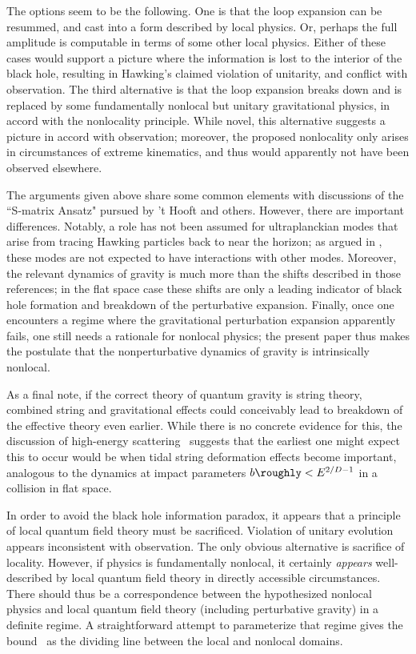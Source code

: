The options seem to be the following.  One is that the loop expansion can be resummed, and cast into a form described by local physics.  Or, perhaps the full amplitude is computable in terms of some other local physics.  Either of these cases would support a picture where the information is lost to the interior of the black hole, resulting in Hawking's claimed violation of unitarity, and conflict with observation.  The third alternative is that the loop expansion breaks down and is replaced by some fundamentally nonlocal but unitary gravitational physics, in accord with the nonlocality principle.  While novel, this alternative suggests a picture in accord with observation; moreover, the proposed nonlocality only arises in circumstances of extreme kinematics, and thus would apparently not have been observed elsewhere.  

The arguments given above share some common elements with discussions of the ``S-matrix Ansatz" pursued by 't Hooft and others.  However, there are important differences.  Notably, a role has not been assumed for ultraplanckian modes that arise from tracing Hawking particles back to near the horizon; as argued in \SGnonloc, these modes are not expected to have interactions with other modes.  Moreover, the relevant dynamics of gravity is much more than the shifts described in those references; in the flat space case these shifts are only a leading indicator of black hole formation and breakdown of the perturbative expansion.  Finally, once one encounters a regime where the gravitational perturbation expansion apparently fails, one still needs a rationale for nonlocal physics; the present paper thus makes the postulate that the nonperturbative dynamics of gravity is intrinsically nonlocal.


As a final note, if the correct theory of quantum gravity is string theory, combined string and gravitational effects could conceivably lead to breakdown of the effective theory even earlier.  While there is no concrete evidence for this, the discussion of high-energy scattering \LQGST\ suggests that the earliest one might expect this to occur would be when tidal string deformation effects become important, analogous to the dynamics at impact parameters $b\roughly< E^{2/D-1}$ in a collision in flat space.


In order to avoid the black hole information paradox, it appears that a principle of local quantum field theory must be sacrificed.  Violation of unitary evolution appears inconsistent with observation\BPS.  The only obvious alternative is sacrifice of locality.  However, if physics is fundamentally nonlocal, it certainly {\it appears} well-described by local quantum field theory in directly accessible circumstances.  There should thus be a correspondence between the hypothesized nonlocal physics and local quantum field theory (including perturbative gravity) in a definite regime.  A straightforward attempt to parameterize that regime  gives the bound \gravbd\ as the dividing line between the local and nonlocal domains.

